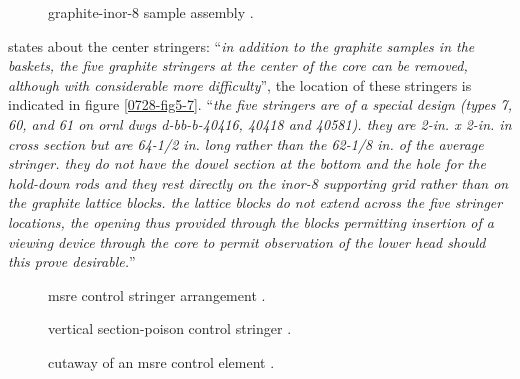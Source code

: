 \documentclass{article}
\newcommand*{\mrsarchive}{../../msr-archive}%
\begin{document}
\begin{figure}[H]
  \centering
  \caption{graphite-inor-8 sample assembly \parencite[figure 5.8]{tm-0728}.}
  \label{0728-fig5-8}
\end{figure}

\parencite[page 84]{ornl-tm-0728} states about the center stringers:
\enquote{\textit{in addition to the graphite samples in the baskets, the five graphite stringers at the center of the core can be removed, although with considerable more difficulty}}, the location of these stringers is indicated in figure \ref{0728-fig5-7}.
\enquote{\textit{the five stringers are of a special design (types 7, 60, and 61 on ornl dwgs d-bb-b-40416, 40418 and 40581). they are 2-in. x 2-in. in cross section but are 64-1/2 in. long rather than the 62-1/8 in. of the average stringer. they do not have the dowel section at the bottom and the hole for the hold-down rods and they rest directly on the inor-8 supporting grid rather than on the graphite lattice blocks. the lattice blocks do not extend across the five stringer locations, the opening thus provided through the blocks permitting insertion of a viewing device through the core to permit observation of the lower head should this prove desirable.}}


\begin{figure}[H]
  \centering
  \caption{msre control stringer arrangement \parencite[figure 14a]{ad-cf-61-2-46}.}
  \label{61246-fig14a}
\end{figure}

\begin{figure}[H]
  \centering
  \caption{vertical section-poison control stringer \parencite[figure 14b]{ad-cf-61-2-46}.}
  \label{61246-fig14b}
\end{figure}

\begin{figure}[H]
  \centering
  \caption{cutaway of an msre control element \parencite[figure 1]{ornl-4123}.}
  \label{4123-fig1}
\end{figure}
\end{document}
